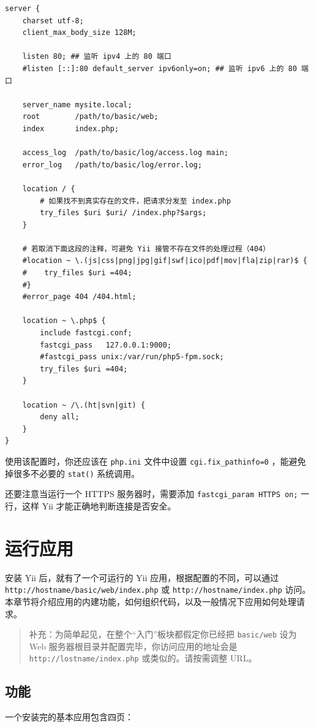 \begin{lstlisting}
server {
    charset utf-8;
    client_max_body_size 128M;

    listen 80; ## 监听 ipv4 上的 80 端口
    #listen [::]:80 default_server ipv6only=on; ## 监听 ipv6 上的 80 端口

    server_name mysite.local;
    root        /path/to/basic/web;
    index       index.php;

    access_log  /path/to/basic/log/access.log main;
    error_log   /path/to/basic/log/error.log;

    location / {
        # 如果找不到真实存在的文件，把请求分发至 index.php
        try_files $uri $uri/ /index.php?$args;
    }

    # 若取消下面这段的注释，可避免 Yii 接管不存在文件的处理过程（404）
    #location ~ \.(js|css|png|jpg|gif|swf|ico|pdf|mov|fla|zip|rar)$ {
    #    try_files $uri =404;
    #}
    #error_page 404 /404.html;

    location ~ \.php$ {
        include fastcgi.conf;
        fastcgi_pass   127.0.0.1:9000;
        #fastcgi_pass unix:/var/run/php5-fpm.sock;
        try_files $uri =404;
    }

    location ~ /\.(ht|svn|git) {
        deny all;
    }
}
\end{lstlisting}
使用该配置时，你还应该在 \lstinline|php.ini| 文件中设置 \lstinline|cgi.fix_pathinfo=0| ，能避免掉很多不必要的 \lstinline|stat()| 系统调用。

还要注意当运行一个 HTTPS 服务器时，需要添加 \lstinline|fastcgi_param HTTPS on;| 一行，这样 Yii 才能正确地判断连接是否安全。



\label{start-workflow.md}\section{运行应用}
安装 Yii 后，就有了一个可运行的 Yii 应用，根据配置的不同，可以通过 \lstinline|http://hostname/basic/web/index.php| 或 \lstinline|http://hostname/index.php| 访问。本章节将介绍应用的内建功能，如何组织代码，以及一般情况下应用如何处理请求。

\begin{quote}补充：为简单起见，在整个“入门”板块都假定你已经把 \lstinline|basic/web| 设为 Web 服务器根目录并配置完毕，你访问应用的地址会是 \lstinline|http://lostname/index.php| 或类似的。请按需调整 URL。

\end{quote}
\subsection{功能 \label{start-workflow.md::functionality}}
一个安装完的基本应用包含四页：

